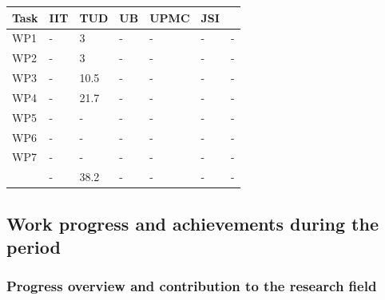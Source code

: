\documentclass[12pt,a4paper,twoside]{article}
\begin{document}
\begin{longtable}{|C{1.5cm}|C{1.5cm}|C{1.5cm}|C{2cm}|C{2cm}|C{2cm}|C{2cm}|}
\footnotesize \textbf{Task}& \footnotesize \textbf{IIT}&\footnotesize \textbf{TUD}&\footnotesize \textbf{UB}& \footnotesize \textbf{UPMC} &\footnotesize \textbf{JSI} &  \\ \hline
\footnotesize WP1 &  -   &  3   &  -   &  -   &  -   &  -   \\  \hline
\footnotesize WP2 &  -   &  3   &  -   &  -   &  -   &  -   \\  \hline
\footnotesize WP3 &  -   &  10.5   &  -   &  -   &  -   &  -   \\  \hline
\footnotesize WP4 &  -   &  21.7   &  -   &  -   &  -   &  -   \\  \hline
\footnotesize WP5 &  -   &  -   &  -   &  -   &  -   &  -   \\  \hline
\footnotesize WP6 &  -   &  -   &  -   &  -   &  -   &  -   \\  \hline
\footnotesize WP7 &  -   &  -   &  -   &  -   &  -   &  -   \\  \hline
{}  & - & 38.2 & - & - & - & - \\  
\end{longtable}










\subsection{Work progress and achievements during the period}

\subsubsection{Progress overview and contribution to the research field}
\end{document}
